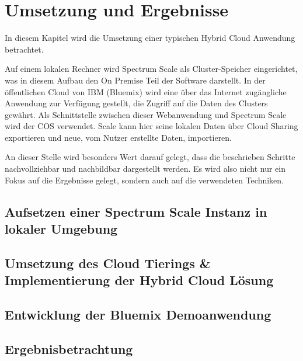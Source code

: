 \chapter{Umsetzung und Ergebnisse}\label{ch:realization}

In diesem Kapitel wird die Umsetzung einer typischen Hybrid Cloud Anwendung betrachtet. 

Auf einem lokalen Rechner wird Spectrum Scale als Cluster-Speicher eingerichtet, was in diesem Aufbau den \gls{On Premise} Teil der Software darstellt.
In der öffentlichen Cloud von IBM (Bluemix) wird eine über das Internet zugängliche Anwendung zur Verfügung gestellt, die Zugriff auf die Daten des Clusters gewährt. Als Schnittstelle zwischen dieser Webanwendung und Spectrum Scale wird der \ac{COS} verwendet. Scale kann hier seine lokalen Daten über Cloud Sharing exportieren und neue, vom Nutzer erstellte Daten, importieren.

An dieser Stelle wird besonders Wert darauf gelegt, dass die beschrieben Schritte nachvollziehbar und nachbildbar dargestellt werden. Es wird also nicht nur ein Fokus auf die Ergebnisse gelegt, sondern auch auf die verwendeten Techniken.

\section{Aufsetzen einer Spectrum Scale Instanz in lokaler Umgebung}


\section{Umsetzung des Cloud Tierings \& Implementierung der Hybrid Cloud Lösung}
\section{Entwicklung der Bluemix Demoanwendung}


\section{Ergebnisbetrachtung}
